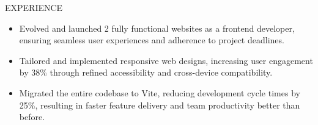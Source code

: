 \documentclass{resume} %
\begin{document}
\begin{rSection}{EXPERIENCE}
\begin{itemize}
\itemsep -3pt{}
\item Evolved and launched 2 fully functional websites as a frontend developer, ensuring seamless user experiences and adherence to project deadlines.
\item Tailored and implemented responsive web designs, increasing user engagement by 38\% through refined accessibility and cross-device compatibility.
\item Migrated the entire codebase to Vite, reducing development cycle times by 25\%, resulting in faster feature delivery and team productivity better than before.
\end{itemize}

\end{rSection}


\end{document}
